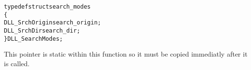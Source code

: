 \documentclass[10pt,letterpaper]{report}
\begin{document}
\begin{description}
\begin{description}
 \begin{alltt}
typedef struct search_modes
   \{
    DLL_SrchOrigin search_origin;
    DLL_SrchDir    search_dir;
   \} DLL_SearchModes;
 \end{alltt}

 This pointer is static within this function so it must be copied immediatly after it is called.


 \end{description}

\end{description}
\end{document}
